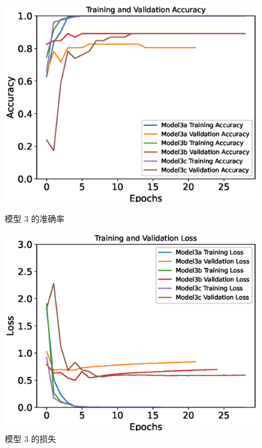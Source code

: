 \begin{figure}[H]
    \centering
    \begin{minipage}{0.49\textwidth}
        \centering
        \includegraphics[width=\textwidth]{./fig/model3/accuracy33.eps}
        \caption{模型 3 的准确率}
        \label{fig:model33_acc}
    \end{minipage}
    \begin{minipage}{0.49\textwidth}
        \centering
        \includegraphics[width=\textwidth]{./fig/model3/loss33.eps}
        \caption{模型 3 的损失}
        \label{fig:model33_loss}
    \end{minipage}
\end{figure}

